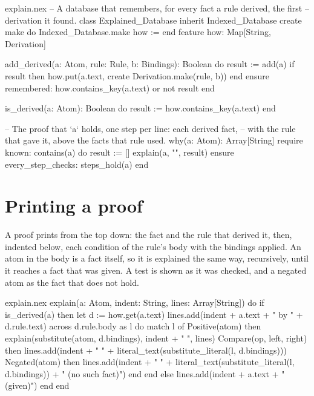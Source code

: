 \begin{continued}{explain.nex}
-- A database that remembers, for every fact a rule derived, the first
-- derivation it found.
class Explained_Database inherit Indexed_Database
create
  make
  do
    Indexed_Database.make
    how := {}
  end
feature
  how: Map[String, Derivation]

  add_derived(a: Atom, rule: Rule, b: Bindings): Boolean
  do
    result := add(a)
    if result then
      how.put(a.text, create Derivation.make(rule, b))
    end
  ensure
    remembered: how.contains_key(a.text) or not result
  end

  is_derived(a: Atom): Boolean
  do
    result := how.contains_key(a.text)
  end

  -- The proof that `a` holds, one step per line: each derived fact,
  -- with the rule that gave it, above the facts that rule used.
  why(a: Atom): Array[String]
  require
    known: contains(a)
  do
    result := []
    explain(a, "", result)
  ensure
    every_step_checks: steps_hold(a)
  end
\end{continued}

\section{Printing a proof}

A proof prints from the top down: the fact and the rule that derived it,
then, indented below, each condition of the rule's body with the bindings
applied. An atom in the body is a fact itself, so it is explained the same
way, recursively, until it reaches a fact that was given. A test is shown
as it was checked, and a negated atom as the fact that does not hold.

\begin{continued}{explain.nex}
  explain(a: Atom, indent: String, lines: Array[String])
  do
    if is_derived(a) then
      let d := how.get(a.text)
      lines.add(indent + a.text + "    by " + d.rule.text)
      across d.rule.body as l do
        match l of
          Positive(atom) then explain(substitute(atom, d.bindings), indent + "  ", lines)
          Compare(op, left, right) then
            lines.add(indent + "  " + literal_text(substitute_literal(l, d.bindings)))
          Negated(atom) then
            lines.add(indent + "  " + literal_text(substitute_literal(l, d.bindings)) + "    (no such fact)")
        end
      end
    else
      lines.add(indent + a.text + "    (given)")
    end
  end
\end{continued}

